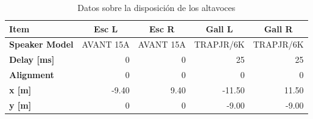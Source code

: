 \documentclass{article}
\begin{document}
\begin{table}[htbp]
    \centering
    \caption{Datos sobre la disposición de los altavoces}
    \begin{tabular}{|l|r|r|r|r|}
        \hline
        \rowcolor[rgb]{ .439,  .678,  .278} \textcolor[rgb]{ 1,  1,  1}{\textbf{Item}}          & \multicolumn{1}{c|}{\cellcolor[rgb]{ 1,1,1}Esc L}     & \multicolumn{1}{c|}{\cellcolor[rgb]{ .886,  .937,  .855}Esc R}     & \multicolumn{1}{c|}{\cellcolor[rgb]{ 1,  1,  1}Gall L}    & \multicolumn{1}{c|}{\cellcolor[rgb]{ .886,  .937,  .855}Gall R} \bigstrut    \\ \hline
        \rowcolor[rgb]{ .439,  .678,  .278} \textcolor[rgb]{ 1,  1,  1}{\textbf{Speaker Model}} & \multicolumn{1}{c|}{\cellcolor[rgb]{ 1,1,1}AVANT 15A} & \multicolumn{1}{c|}{\cellcolor[rgb]{ .886,  .937,  .855}AVANT 15A} & \multicolumn{1}{c|}{\cellcolor[rgb]{ 1,  1,  1}TRAPJR/6K} & \multicolumn{1}{c|}{\cellcolor[rgb]{ .886,  .937,  .855}TRAPJR/6K} \bigstrut \\ \hline
        \rowcolor[rgb]{ .439,  .678,  .278} \textcolor[rgb]{ 1,  1,  1}{\textbf{Delay [ms]}}    & \cellcolor[rgb]{ 1,1,1}0                              & \cellcolor[rgb]{ .886,  .937,  .855}0                              & \cellcolor[rgb]{ 1,  1,  1}25                             & \cellcolor[rgb]{ .886,  .937,  .855}25 \bigstrut                             \\ \hline
        \rowcolor[rgb]{ .439,  .678,  .278} \textcolor[rgb]{ 1,  1,  1}{\textbf{Alignment}}     & \cellcolor[rgb]{ 1,1,1}0                              & \cellcolor[rgb]{ .886,  .937,  .855}0                              & \cellcolor[rgb]{ 1,  1,  1}0                              & \cellcolor[rgb]{ .886,  .937,  .855}0 \bigstrut                              \\ \hline
        \rowcolor[rgb]{ .439,  .678,  .278} \textcolor[rgb]{ 1,  1,  1}{\textbf{x [m]}}         & \cellcolor[rgb]{ 1,1,1}-9.40                          & \cellcolor[rgb]{ .886,  .937,  .855}9.40                           & \cellcolor[rgb]{ 1,  1,  1}-11.50                         & \cellcolor[rgb]{ .886,  .937,  .855}11.50 \bigstrut                          \\ \hline
        \rowcolor[rgb]{ .439,  .678,  .278} \textcolor[rgb]{ 1,  1,  1}{\textbf{y [m]}}         & \cellcolor[rgb]{ 1,1,1}0                              & \cellcolor[rgb]{ .886,  .937,  .855}0                              & \cellcolor[rgb]{ 1,  1,  1}-9.00                          & \cellcolor[rgb]{ .886,  .937,  .855}-9.00 \bigstrut                          \\ \hline

\end{tabular}
\end{table}
\end{document}
